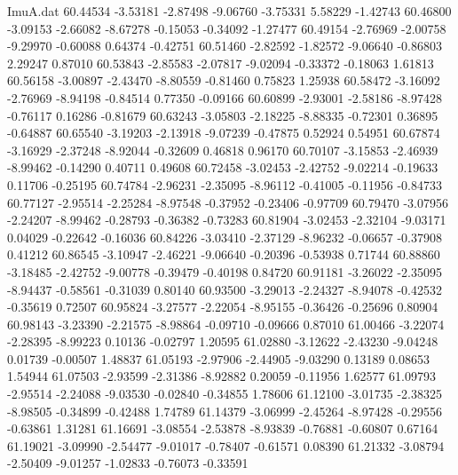 \begin{filecontents}{ImuA.dat}
  60.44534   -3.53181   -2.87498   -9.06760   -3.75331    5.58229   -1.42743
  60.46800   -3.09153   -2.66082   -8.67278   -0.15053   -0.34092   -1.27477
  60.49154   -2.76969   -2.00758   -9.29970   -0.60088    0.64374   -0.42751
  60.51460   -2.82592   -1.82572   -9.06640   -0.86803    2.29247    0.87010
  60.53843   -2.85583   -2.07817   -9.02094   -0.33372   -0.18063    1.61813
  60.56158   -3.00897   -2.43470   -8.80559   -0.81460    0.75823    1.25938
  60.58472   -3.16092   -2.76969   -8.94198   -0.84514    0.77350   -0.09166
  60.60899   -2.93001   -2.58186   -8.97428   -0.76117    0.16286   -0.81679
  60.63243   -3.05803   -2.18225   -8.88335   -0.72301    0.36895   -0.64887
  60.65540   -3.19203   -2.13918   -9.07239   -0.47875    0.52924    0.54951
  60.67874   -3.16929   -2.37248   -8.92044   -0.32609    0.46818    0.96170
  60.70107   -3.15853   -2.46939   -8.99462   -0.14290    0.40711    0.49608
  60.72458   -3.02453   -2.42752   -9.02214   -0.19633    0.11706   -0.25195
  60.74784   -2.96231   -2.35095   -8.96112   -0.41005   -0.11956   -0.84733
  60.77127   -2.95514   -2.25284   -8.97548   -0.37952   -0.23406   -0.97709
  60.79470   -3.07956   -2.24207   -8.99462   -0.28793   -0.36382   -0.73283
  60.81904   -3.02453   -2.32104   -9.03171    0.04029   -0.22642   -0.16036
  60.84226   -3.03410   -2.37129   -8.96232   -0.06657   -0.37908    0.41212
  60.86545   -3.10947   -2.46221   -9.06640   -0.20396   -0.53938    0.71744
  60.88860   -3.18485   -2.42752   -9.00778   -0.39479   -0.40198    0.84720
  60.91181   -3.26022   -2.35095   -8.94437   -0.58561   -0.31039    0.80140
  60.93500   -3.29013   -2.24327   -8.94078   -0.42532   -0.35619    0.72507
  60.95824   -3.27577   -2.22054   -8.95155   -0.36426   -0.25696    0.80904
  60.98143   -3.23390   -2.21575   -8.98864   -0.09710   -0.09666    0.87010
  61.00466   -3.22074   -2.28395   -8.99223    0.10136   -0.02797    1.20595
  61.02880   -3.12622   -2.43230   -9.04248    0.01739   -0.00507    1.48837
  61.05193   -2.97906   -2.44905   -9.03290    0.13189    0.08653    1.54944
  61.07503   -2.93599   -2.31386   -8.92882    0.20059   -0.11956    1.62577
  61.09793   -2.95514   -2.24088   -9.03530   -0.02840   -0.34855    1.78606
  61.12100   -3.01735   -2.38325   -8.98505   -0.34899   -0.42488    1.74789
  61.14379   -3.06999   -2.45264   -8.97428   -0.29556   -0.63861    1.31281
  61.16691   -3.08554   -2.53878   -8.93839   -0.76881   -0.60807    0.67164
  61.19021   -3.09990   -2.54477   -9.01017   -0.78407   -0.61571    0.08390
  61.21332   -3.08794   -2.50409   -9.01257   -1.02833   -0.76073   -0.33591

\end{filecontents}
